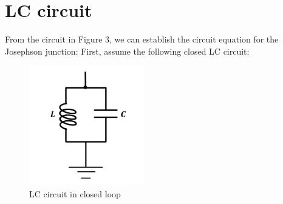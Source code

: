 \documentclass{article}[12pt]
\numberwithin{equation}{section}
\begin{document}
\section{LC circuit}
\begin{spacing}{1.5}
From the circuit in Figure 3, we can establish the circuit equation for the Josephson junction:
First, assume the following closed LC circuit:
\begin{figure}[htbp]
  \centerline{\includegraphics[width=5cm]{TexFigure/LCcircuit.png}}
  \caption{LC circuit in closed loop}
  \label{fig:reentrant}
\end{figure}


\end{spacing}
\end{document}
